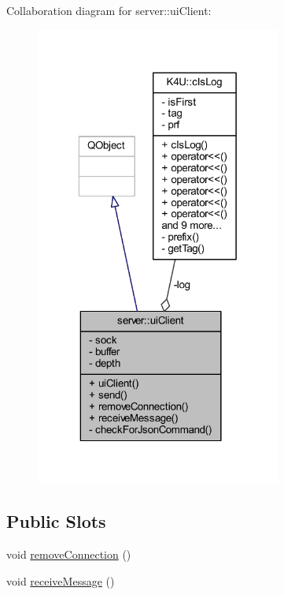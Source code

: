 Collaboration diagram for server\-:\-:ui\-Client\-:\nopagebreak
\begin{figure}[H]
\begin{center}
\leavevmode
\includegraphics[width=229pt]{dd/dc9/classserver_1_1ui_client__coll__graph}
\end{center}
\end{figure}
\subsection*{Public Slots}
\begin{DoxyCompactItemize}
\item 
void \hyperlink{classserver_1_1ui_client_aa66a0dc28bb1d07f22467b127ff90cc6}{remove\-Connection} ()
\item 
void \hyperlink{classserver_1_1ui_client_afdda23f96c586fdcb47f1abad7be99f5}{receive\-Message} ()
\end{DoxyCompactItemize}
